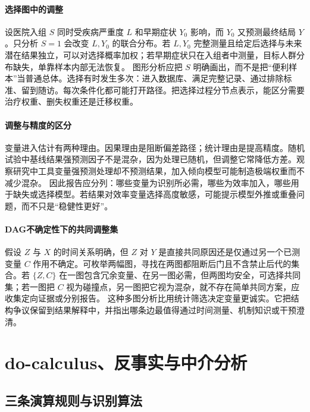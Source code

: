 \paragraph{选择图中的调整}

设医院入组 $S$ 同时受疾病严重度 $L$ 和早期症状 $Y_0$ 影响，而 $Y_0$ 又预测最终结局 $Y$。只分析 $S=1$ 会改变 $L,Y_0$ 的联合分布。若 $L,Y_0$ 完整测量且给定后选择与未来潜在结果独立，可以对选择概率加权；若早期症状只在入组者中测量，目标人群分布缺失，单靠样本内部无法恢复。
图形分析应把 $S$ 明确画出，而不是把“便利样本”当普通总体。选择有时发生多次：进入数据库、满足完整记录、通过排除标准、留到随访。每次条件化都可能打开路径。把选择过程分节点表示，能区分需要治疗权重、删失权重还是迁移权重。

\paragraph{调整与精度的区分}

变量进入估计有两种理由。因果理由是阻断偏差路径；统计理由是提高精度。随机试验中基线结果强预测因子不是混杂，因为处理已随机，但调整它常降低方差。观察研究中工具变量强预测处理却不预测结果，加入倾向模型可能制造极端权重而不减少混杂。
因此报告应分列：哪些变量为识别所必需，哪些为效率加入，哪些用于缺失或选择模型。若结果对效率变量选择高度敏感，可能提示模型外推或重叠问题，而不只是“稳健性更好”。

\paragraph{DAG不确定性下的共同调整集}

假设 $Z$ 与 $X$ 的时间关系明确，但 $Z$ 对 $Y$ 是直接共同原因还是仅通过另一个已测变量 $C$ 作用不确定。可枚举两幅图，寻找在两图都阻断后门且不含禁止后代的集合。若 $\{Z,C\}$ 在一图包含冗余变量、在另一图必需，但两图均安全，可选择共同集；若一图把 $C$ 视为碰撞点，另一图把它视为混杂，就不存在简单共同方案，应收集定向证据或分别报告。
这种多图分析比用统计筛选决定变量更诚实。它把结构争议保留到结果解释中，并指出哪条边最值得通过时间测量、机制知识或干预澄清。

\section{do-calculus、反事实与中介分析}

\subsection{三条演算规则与识别算法}

